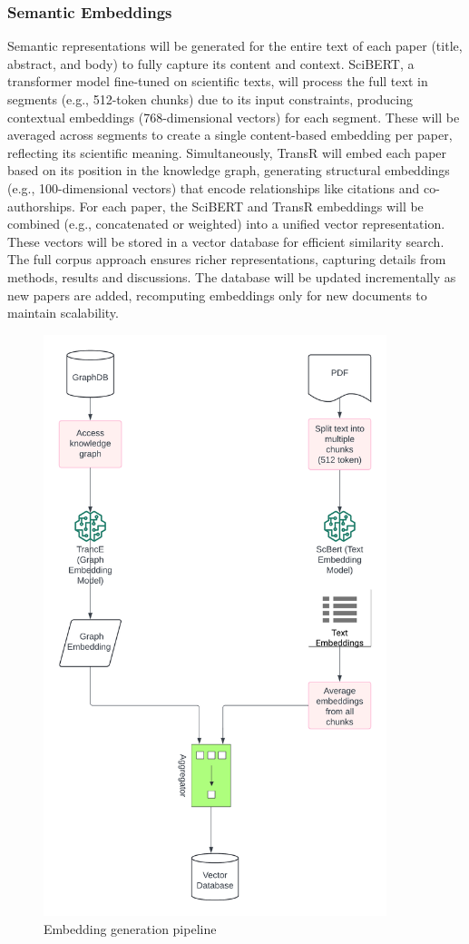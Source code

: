 \documentclass[a4paper,12pt]{article}
\begin{document}
\subsubsection{Semantic Embeddings}
Semantic representations will be generated for the entire text of each paper
(title, abstract, and body) to fully capture its content and context. SciBERT,
a transformer model fine-tuned on scientific texts, will process the full text
in segments (e.g., 512-token chunks) due to its input constraints, producing
contextual embeddings (768-dimensional vectors) for each segment. These will be
averaged across segments to create a single content-based embedding per paper,
reflecting its scientific meaning. Simultaneously, TransR will embed each paper
based on its position in the knowledge graph, generating structural embeddings
(e.g., 100-dimensional vectors) that encode relationships like citations and
co-authorships. For each paper, the SciBERT
\parencite{beltagy2019scibertpretrainedlanguagemodel} and TransR
\parencite{10.3233/JIFS-202177} embeddings will be combined (e.g., concatenated or
weighted) into a unified vector representation. These vectors will be stored in a
vector database for efficient similarity search. The full corpus approach ensures
richer representations, capturing details from methods, results and discussions.
The database will be updated incrementally as new papers are added, recomputing
embeddings only for new documents to maintain scalability.
\begin{figure}[H]
    \centering
    \includegraphics[width=10cm]{semanticembedding.png}
    \caption{Embedding generation pipeline}
\end{figure}
\newpage
\end{document}
